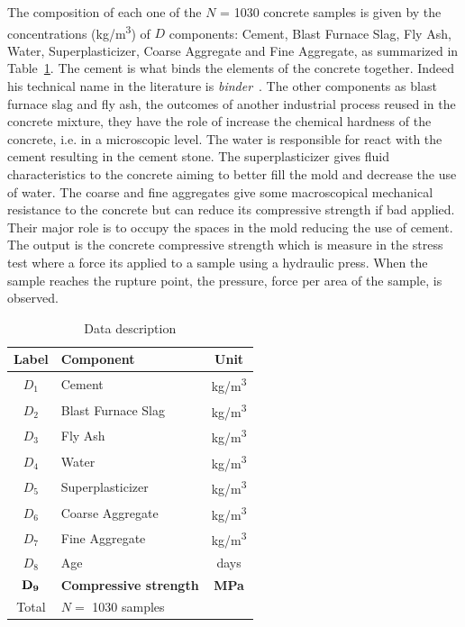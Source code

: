 \documentclass[conference]{IEEEtran}
\begin{document}
The composition of each one of the $N$ = 1030 concrete samples is given by the concentrations (kg/m\textsuperscript{3}) of $D$ components: Cement, Blast Furnace Slag, Fly Ash, Water, Superplasticizer, Coarse Aggregate and Fine Aggregate, as summarized in Table~\ref{data_description_table}. 
%
The cement is what binds the elements of the concrete together. 
%
Indeed his technical name in the literature is \emph{binder}~\cite{b5}. 
%
The other components as blast furnace slag and fly ash, the outcomes of another industrial process reused in the concrete mixture, they have the role of increase the chemical hardness of the concrete, i.e. in a microscopic level. 
%
The water is responsible for react with the cement resulting in the cement stone. 
%
The superplasticizer gives fluid characteristics to the concrete aiming to better fill the mold and decrease the use of water. 
%
The coarse and fine aggregates give some macroscopical mechanical resistance to the concrete but can reduce its compressive strength if bad applied. 
%
Their major role is to occupy the spaces in the mold reducing the use of cement. 
%
The output is the concrete compressive strength which is measure in the stress test where a force its applied to a sample using a hydraulic press. 
%
When the sample reaches the rupture point, the pressure, force per area of the sample, is observed. 

\begin{table}[htp]
\caption{Data description}
\begin{center}
  \begin{tabular}{@{} clc @{}}
    \toprule
    Label & Component & Unit \\ 
    \midrule
    $D_1$ & Cement & kg/m\textsuperscript{3} \\ 
    $D_2$ & Blast Furnace Slag & kg/m\textsuperscript{3} \\ 
    $D_3$ & Fly Ash & kg/m\textsuperscript{3} \\ 
    $D_4$ & Water & kg/m\textsuperscript{3} \\ 
    $D_5$ & Superplasticizer & kg/m\textsuperscript{3} \\ 
    $D_6$ & Coarse Aggregate & kg/m\textsuperscript{3} \\ 
    $D_7$ & Fine Aggregate & kg/m\textsuperscript{3} \\ 
    $D_8$ & Age & days \\ 
    ${\bf D_9}$ & {\bf Compressive strength} & {\bf MPa} \\ 
	\midrule
    Total & $N=$ 1030 samples&  \\ 
    \bottomrule
  \end{tabular}
\end{center}
\label{data_description_table}
\end{table}%
\end{document}
